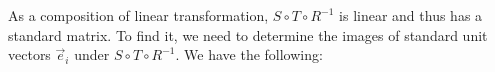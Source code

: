 \documentclass{ximera}
\begin{document}
As a composition of linear transformation, $S\circ T\circ R^{-1}$ is linear and thus has a standard matrix.
To find it, we need to determine the images of standard unit vectors $\vec{e}_i$ under $S\circ T\circ R^{-1}$. We have the following:

\end{document}
